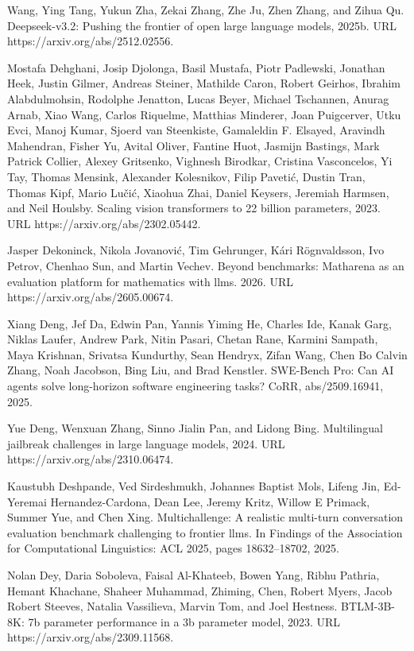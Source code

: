 \documentclass[
  10
]{article}
\begin{document}
Wang, Ying Tang, Yukun Zha, Zekai Zhang, Zhe Ju, Zhen Zhang, and Zihua
Qu. Deepseek-v3.2: Pushing the frontier of open large language models,
2025b. URL https://arxiv.org/abs/2512.02556.

Mostafa Dehghani, Josip Djolonga, Basil Mustafa, Piotr Padlewski,
Jonathan Heek, Justin Gilmer, Andreas Steiner, Mathilde Caron, Robert
Geirhos, Ibrahim Alabdulmohsin, Rodolphe Jenatton, Lucas Beyer, Michael
Tschannen, Anurag Arnab, Xiao Wang, Carlos Riquelme, Matthias Minderer,
Joan Puigcerver, Utku Evci, Manoj Kumar, Sjoerd van Steenkiste,
Gamaleldin F. Elsayed, Aravindh Mahendran, Fisher Yu, Avital Oliver,
Fantine Huot, Jasmijn Bastings, Mark Patrick Collier, Alexey Gritsenko,
Vighnesh Birodkar, Cristina Vasconcelos, Yi Tay, Thomas Mensink,
Alexander Kolesnikov, Filip Pavetić, Dustin Tran, Thomas Kipf, Mario
Lučić, Xiaohua Zhai, Daniel Keysers, Jeremiah Harmsen, and Neil Houlsby.
Scaling vision transformers to 22 billion parameters, 2023. URL
https://arxiv.org/abs/2302.05442.

Jasper Dekoninck, Nikola Jovanović, Tim Gehrunger, Kári Rögnvaldsson,
Ivo Petrov, Chenhao Sun, and Martin Vechev. Beyond benchmarks: Matharena
as an evaluation platform for mathematics with llms. 2026. URL
https://arxiv.org/abs/2605.00674.

Xiang Deng, Jef Da, Edwin Pan, Yannis Yiming He, Charles Ide, Kanak
Garg, Niklas Laufer, Andrew Park, Nitin Pasari, Chetan Rane, Karmini
Sampath, Maya Krishnan, Srivatsa Kundurthy, Sean Hendryx, Zifan Wang,
Chen Bo Calvin Zhang, Noah Jacobson, Bing Liu, and Brad Kenstler.
SWE-Bench Pro: Can AI agents solve long-horizon software engineering
tasks? CoRR, abs/2509.16941, 2025.

Yue Deng, Wenxuan Zhang, Sinno Jialin Pan, and Lidong Bing. Multilingual
jailbreak challenges in large language models, 2024. URL
https://arxiv.org/abs/2310.06474.

Kaustubh Deshpande, Ved Sirdeshmukh, Johannes Baptist Mols, Lifeng Jin,
Ed-Yeremai Hernandez-Cardona, Dean Lee, Jeremy Kritz, Willow E Primack,
Summer Yue, and Chen Xing. Multichallenge: A realistic multi-turn
conversation evaluation benchmark challenging to frontier llms. In
Findings of the Association for Computational Linguistics: ACL 2025, pages
18632--18702, 2025.

Nolan Dey, Daria Soboleva, Faisal Al-Khateeb, Bowen Yang, Ribhu Pathria,
Hemant Khachane, Shaheer Muhammad, Zhiming, Chen, Robert Myers, Jacob
Robert Steeves, Natalia Vassilieva, Marvin Tom, and Joel Hestness.
BTLM-3B-8K: 7b parameter performance in a 3b parameter model, 2023. URL
https://arxiv.org/abs/2309.11568.
\end{document}
